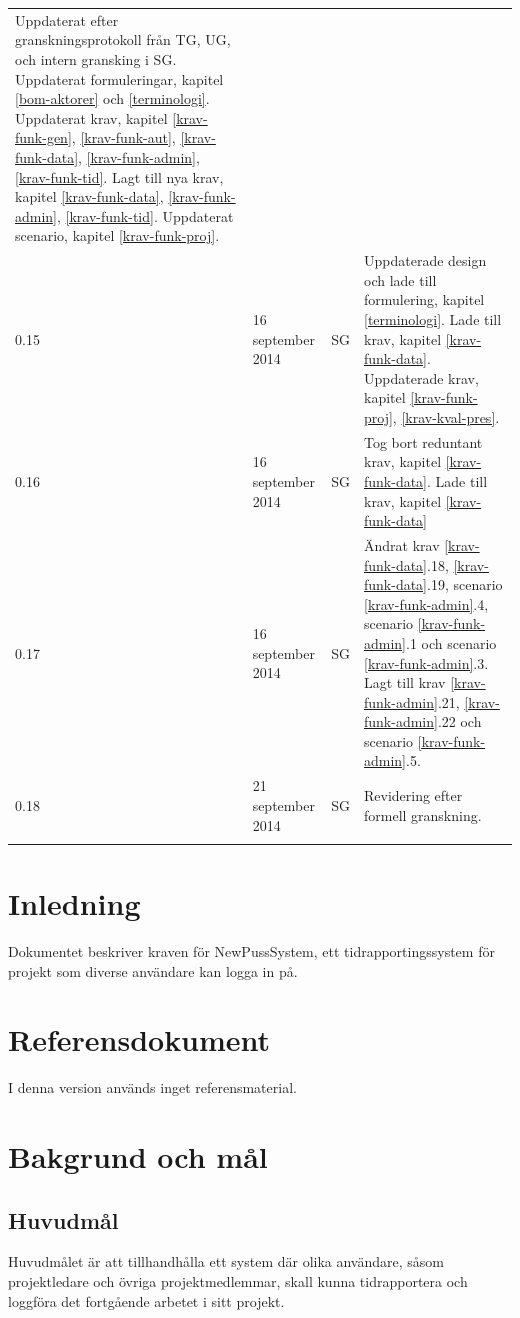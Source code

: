 \documentclass[a4paper]{article}
\begin{document}
\begin{tabular}{ l l l p{8.5cm} }
Uppdaterat efter granskningsprotokoll från TG, UG, och intern gransking i SG.
Uppdaterat formuleringar, kapitel \ref{bom-aktorer} och \ref{terminologi}. 
Uppdaterat krav, kapitel \ref{krav-funk-gen}, \ref{krav-funk-aut}, \ref{krav-funk-data}, \ref{krav-funk-admin}, \ref{krav-funk-tid}.
Lagt till nya krav, kapitel \ref{krav-funk-data}, \ref{krav-funk-admin}, \ref{krav-funk-tid}.
Uppdaterat scenario, kapitel \ref{krav-funk-proj}. \\
0.15 & 16 september 2014 & SG & Uppdaterade design och lade till formulering, kapitel \ref{terminologi}.
Lade till krav, kapitel \ref{krav-funk-data}.
Uppdaterade krav, kapitel \ref{krav-funk-proj}, \ref{krav-kval-pres}.\\
0.16 & 16 september 2014 & SG & Tog bort reduntant krav, kapitel \ref{krav-funk-data}.
Lade till krav, kapitel \ref{krav-funk-data}\\
0.17 & 16 september 2014 & SG & Ändrat krav \ref{krav-funk-data}.18, \ref{krav-funk-data}.19, scenario \ref{krav-funk-admin}.4, scenario \ref{krav-funk-admin}.1 och scenario \ref{krav-funk-admin}.3. Lagt till krav \ref{krav-funk-admin}.21, \ref{krav-funk-admin}.22 och scenario \ref{krav-funk-admin}.5.
\\
0.18 & 21 september 2014 & SG & Revidering efter formell granskning.\\

\\
\end{tabular}
\section{Inledning}       
Dokumentet beskriver kraven för NewPussSystem, ett tidrapportingssystem för projekt som diverse användare kan logga in på.

\section{Referensdokument}
I denna version används inget referensmaterial.
\section{Bakgrund och mål}   
\subsection{Huvudmål}
Huvudmålet är att tillhandhålla ett system där olika användare, såsom projektledare och övriga projektmedlemmar, skall kunna tidrapportera och loggföra det fortgående arbetet i sitt projekt. 
\end{document}
